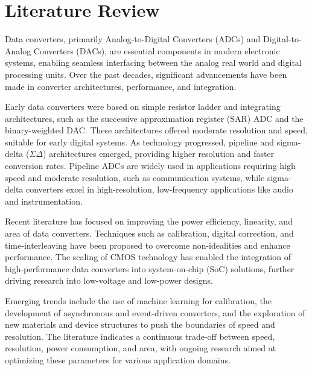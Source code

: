 \chapter{Literature Review}
\addborderb
Data converters, primarily Analog-to-Digital Converters (ADCs) and Digital-to-Analog Converters (DACs), are essential components in modern electronic systems, enabling seamless interfacing between the analog real world and digital processing units. Over the past decades, significant advancements have been made in converter architectures, performance, and integration.

Early data converters were based on simple resistor ladder and integrating architectures, such as the successive approximation register (SAR) ADC and the binary-weighted DAC. These architectures offered moderate resolution and speed, suitable for early digital systems. As technology progressed, pipeline and sigma-delta (\(\Sigma\Delta\)) architectures emerged, providing higher resolution and faster conversion rates. Pipeline ADCs are widely used in applications requiring high speed and moderate resolution, such as communication systems, while sigma-delta converters excel in high-resolution, low-frequency applications like audio and instrumentation.

Recent literature has focused on improving the power efficiency, linearity, and area of data converters. Techniques such as calibration, digital correction, and time-interleaving have been proposed to overcome non-idealities and enhance performance. The scaling of CMOS technology has enabled the integration of high-performance data converters into system-on-chip (SoC) solutions, further driving research into low-voltage and low-power designs.

Emerging trends include the use of machine learning for calibration, the development of asynchronous and event-driven converters, and the exploration of new materials and device structures to push the boundaries of speed and resolution. The literature indicates a continuous trade-off between speed, resolution, power consumption, and area, with ongoing research aimed at optimizing these parameters for various application domains.